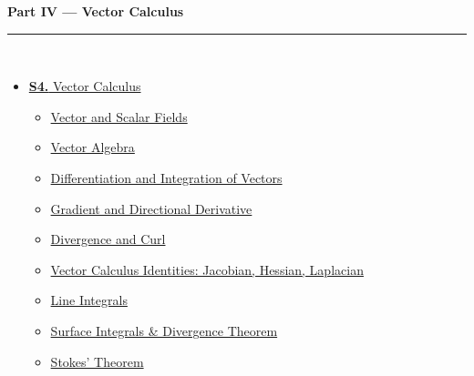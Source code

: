 \documentclass[12pt,a4paper]{article}
\begin{document}
\begin{tcolorbox}[breakable,colback=cD!5,colframe=cD,boxrule=1pt,arc=5pt,
  left=8pt,right=8pt,top=8pt,bottom=8pt,before skip=4pt]
  {\large\bfseries\textcolor{cD}{Part IV --- Vector Calculus}}\\[5pt]
  \textcolor{cD!40}{\rule{\textwidth}{0.4pt}}\\[3pt]
  \small\begin{itemize}[leftmargin=1.2em,itemsep=1pt,label={\textcolor{cD}{$\triangleright$}}]
    \item \hyperref[sec:S4]{\textbf{S4.} Vector Calculus}
      \begin{itemize}[leftmargin=1.5em,itemsep=0pt,label={\textcolor{cD}{$\cdot$}}]
        \item \hyperref[sub:s4-fields]{Vector and Scalar Fields}
        \item \hyperref[sub:s4-algebra]{Vector Algebra}
        \item \hyperref[sub:s4-diffint]{Differentiation and Integration of Vectors}
        \item \hyperref[sub:s4-gradient]{Gradient and Directional Derivative}
        \item \hyperref[sub:s4-divcurl]{Divergence and Curl}
        \item \hyperref[sub:s4-identities]{Vector Calculus Identities: Jacobian, Hessian, Laplacian}
        \item \hyperref[sub:s4-lineint]{Line Integrals}
        \item \hyperref[sub:s4-surface]{Surface Integrals \& Divergence Theorem}
        \item \hyperref[sub:s4-stokes]{Stokes' Theorem}
      \end{itemize}
  \end{itemize}
\end{tcolorbox}

\vspace{6pt}
\end{document}

